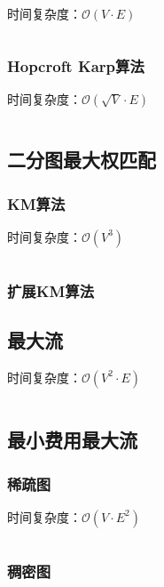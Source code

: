 \documentclass[a4paper]{article}
\newcommand{\cppcode}[1]{
    \inputminted[mathescape]{cpp}{source/#1}
}
\begin{document}
时间复杂度：$\mathcal{O}(V \cdot E)$

\cppcode{graph-theory/maximum-matching-hungary.cpp}

\subsubsection{Hopcroft Karp算法}

时间复杂度：$\mathcal{O}(\sqrt{V} \cdot E)$

\cppcode{graph-theory/maximum-matching-hopcroft-karp.cpp}

\subsection{二分图最大权匹配}

\subsubsection{KM算法}

时间复杂度：$\mathcal{O}(V^3)$

\cppcode{graph-theory/maximum-weight-matching.cpp}

\subsubsection{扩展KM算法}

\subsection{最大流}

时间复杂度：$\mathcal{O}(V^2 \cdot E)$

\cppcode{graph-theory/maximum-flow.cpp}

\subsection{最小费用最大流}

\subsubsection{稀疏图}

时间复杂度：$\mathcal{O}(V \cdot E^2)$

\cppcode{graph-theory/minimum-cost-flow-spfa.cpp}

\subsubsection{稠密图}
\end{document}
